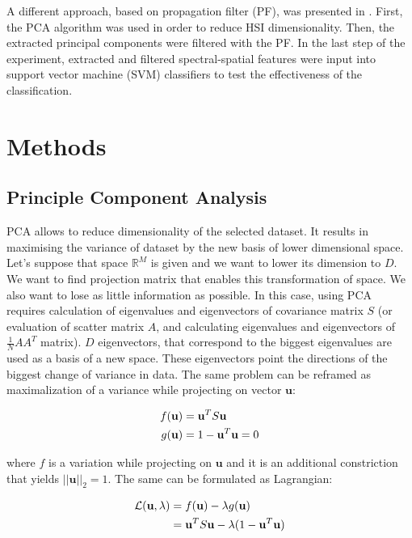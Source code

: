 \documentclass[a4paper, 10 pt, journal]{ieeeconf}
\newcommand{\bb}{\textbf}
\begin{document}
A different approach, based on propagation filter (PF), was presented in \cite{propagation-filter}. First, the PCA algorithm was used in order to reduce HSI dimensionality. Then, the extracted principal components were filtered with the PF. In the last step of the experiment, extracted and filtered spectral-spatial features were input into support vector machine (SVM) classifiers to test the effectiveness of the classification.

\section{Methods}

\subsection{Principle Component Analysis}
PCA allows to reduce dimensionality of the selected dataset. It results in maximising the variance of dataset by the new basis of lower dimensional space. Let's suppose that space $\mathbb{R}^{M}$ is given and we want to lower its dimension to $D$. We want to find projection matrix that enables this transformation of space. We also want to lose as little information as possible. In this case, using PCA requires calculation of eigenvalues and eigenvectors of covariance matrix $S$ (or evaluation of scatter matrix $A$, and calculating eigenvalues and eigenvectors of $\frac{1}{N}AA^{T}$ matrix). $D$ eigenvectors, that correspond to the biggest eigenvalues are used as a basis of a new space. These eigenvectors point the directions of the biggest change of variance in data.  The same problem can be reframed as maximalization of  a variance while projecting on vector $\bb{u}$:

\begin{align}
	f(\bb{u}) &= \bb{u}^T S \bb{u} \\
	g(\bb{u}) &= 1 - \bb{u}^T \bb{u} = 0   \notag
\end{align}

where $f$ is a variation while projecting on $\bb{u}$ and it is an additional constriction that yields $||\bb{u}||_{2} = 1$. The same can be formulated as Lagrangian:

\begin{align}
	\mathcal{L}(\bb{u}, \lambda) &= f(\bb{u}) - \lambda g(\bb{u}) \\
	    &= \bb{u}^T S \bb{u} - \lambda (1 - \bb{u}^T \bb{u})   \notag
\end{align}
\end{document}
